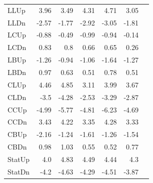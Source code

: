 \begin{table}[htbp]
{\begin{tabular}{lrrrrrr}
LLUp                               & 3.96               & 3.49                 & 4.31                 & 4.71                 & 3.05                 \\
LLDn                               & -2.57              & -1.77                & -2.92                & -3.05                & -1.81                \\
LCUp                               & -0.88              & -0.49                & -0.99                & -0.94                & -0.14                \\
LCDn                               & 0.83               & 0.8                  & 0.66                 & 0.65                 & 0.26                 \\
LBUp                               & -1.26              & -0.94                & -1.06                & -1.64                & -1.27                \\
LBDn                               & 0.97               & 0.63                 & 0.51                 & 0.78                 & 0.51                 \\
CLUp                               & 4.46               & 4.85                 & 3.11                 & 3.99                 & 3.67                 \\
CLDn                               & -3.5               & -4.28                & -2.53                & -3.29                & -2.87                \\
CCUp                               & -4.99              & -5.77                & -4.81                & -6.23                & -4.69                \\
CCDn                               & 3.43               & 4.22                 & 3.35                 & 4.28                 & 3.33                 \\
CBUp                               & -2.16              & -1.24                & -1.61                & -1.26                & -1.54                \\
CBDn                               & 0.98               & 1.03                 & 0.55                 & 0.52                 & 0.77                 \\
StatUp                             & 4.0                & 4.83                 & 4.49                 & 4.44                 & 4.3                  \\
StatDn                             & -4.2               & -4.63                & -4.29                & -4.51                & -3.87                \\

\end{tabular}}
\end{table}

